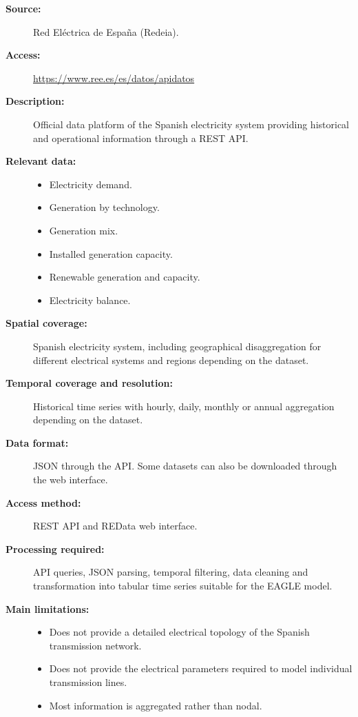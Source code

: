 \begin{description}

    \item[\textbf{Source:}]
    Red Eléctrica de España (Redeia).

    \item[\textbf{Access:}]
    \url{https://www.ree.es/es/datos/apidatos}

    \item[\textbf{Description:}]
    Official data platform of the Spanish electricity system providing
    historical and operational information through a REST API.

    \item[\textbf{Relevant data:}] \hfill
    \begin{itemize}
        \item Electricity demand.
        \item Generation by technology.
        \item Generation mix.
        \item Installed generation capacity.
        \item Renewable generation and capacity.
        \item Electricity balance.
    \end{itemize}

    \item[\textbf{Spatial coverage:}]
    Spanish electricity system, including geographical disaggregation
    for different electrical systems and regions depending on the dataset.

    \item[\textbf{Temporal coverage and resolution:}]
    Historical time series with hourly, daily, monthly or annual
    aggregation depending on the dataset.

    \item[\textbf{Data format:}]
    JSON through the API. Some datasets can also be downloaded
    through the web interface.

    \item[\textbf{Access method:}]
    REST API and REData web interface.

    \item[\textbf{Processing required:}]
    API queries, JSON parsing, temporal filtering, data cleaning and
    transformation into tabular time series suitable for the EAGLE model.

    \item[\textbf{Main limitations:}] \hfill
    \begin{itemize}
        \item Does not provide a detailed electrical topology of the
        Spanish transmission network.
        \item Does not provide the electrical parameters required to
        model individual transmission lines.
        \item Most information is aggregated rather than nodal.
    \end{itemize}


\end{description}
